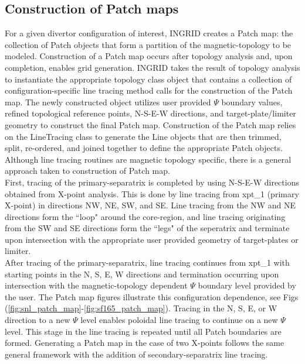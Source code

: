 \subsection{Construction of Patch maps}
For a given divertor configuration of interest, INGRID creates a Patch map: the collection of Patch objects that form a partition of the magnetic-topology to be modeled. Construction of a Patch map occurs after topology analysis and, upon completion, enables grid generation. INGRID takes the result of topology analysis to instantiate the appropriate topology class object that contains a collection of configuration-specific line tracing method calls for the construction of the Patch map. The newly constructed object  utilizes user provided $\Psi$ boundary values, refined topological reference points, N-S-E-W directions, and target-plate/limiter geometry to construct the final Patch map. Construction of the Patch map relies on the LineTracing class to generate the Line objects that are then trimmed, split, re-ordered, and joined together to define the appropriate Patch objects. Although line tracing routines are magnetic topology specific, there is a general approach taken to construction of Patch map.\\
First, tracing of the primary-separatrix is completed by using N-S-E-W directions obtained from X-point analysis. This is done by line tracing from xpt\_1 (primary X-point) in directions NW, NE, SW, and SE. Line tracing from the NW and NE directions form the ``loop" around the core-region, and line tracing originating from the SW and SE directions form the ``legs" of the seperatrix and terminate upon intersection with the appropriate user provided geometry of target-plates or limiter. \\
After tracing of the primary-separatrix, line tracing continues from xpt\_1 with starting points in the N, S, E, W directions and termination occurring upon intersection with the magnetic-topology dependent $\Psi$ boundary level provided by the user. The Patch map figures illustrate this configuration dependence, see Figs (\ref{fig:snl_patch_map}-\ref{fig:sf165_patch_map}). Tracing in the N, S, E, or W direction to a new $\Psi$ level enables poloidal line tracing to continue on a new $\Psi$ level. This stage in the line tracing is repeated until all Patch boundaries are formed. Generating a Patch map in the case of two X-points follows the same general framework with the addition of secondary-separatrix line tracing.